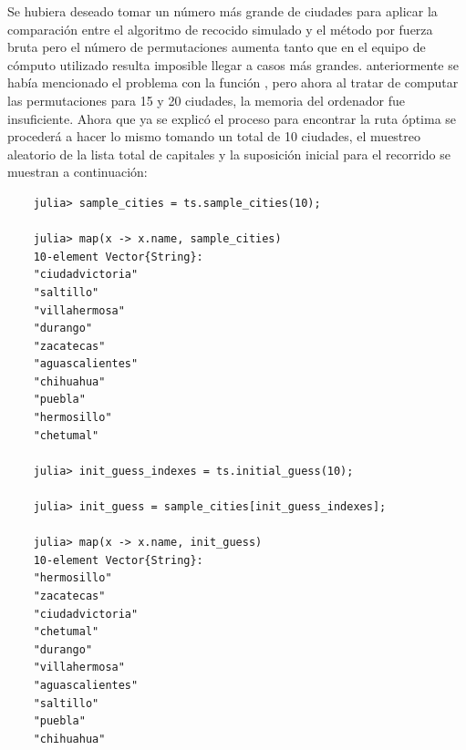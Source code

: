 Se hubiera deseado tomar un número más grande de ciudades para aplicar la comparación entre el algoritmo de recocido simulado y el método por fuerza bruta pero el número de permutaciones aumenta tanto que en el equipo de cómputo utilizado resulta imposible llegar a casos más grandes. anteriormente se había mencionado el problema con la función , pero ahora al tratar de computar las permutaciones para 15 y 20 ciudades, la memoria del ordenador fue insuficiente. Ahora que ya se explicó el proceso para encontrar la ruta óptima se procederá a hacer lo mismo tomando un total de 10 ciudades, el muestreo aleatorio de la lista total de capitales y la suposición inicial para el recorrido se muestran a continuación:
\begin{verbatim}
    julia> sample_cities = ts.sample_cities(10);

    julia> map(x -> x.name, sample_cities)
    10-element Vector{String}:
    "ciudadvictoria"
    "saltillo"
    "villahermosa"
    "durango"
    "zacatecas"
    "aguascalientes"
    "chihuahua"
    "puebla"
    "hermosillo"
    "chetumal"

    julia> init_guess_indexes = ts.initial_guess(10);

    julia> init_guess = sample_cities[init_guess_indexes];

    julia> map(x -> x.name, init_guess)
    10-element Vector{String}:
    "hermosillo"
    "zacatecas"
    "ciudadvictoria"
    "chetumal"
    "durango"
    "villahermosa"
    "aguascalientes"
    "saltillo"
    "puebla"
    "chihuahua"
\end{verbatim}

